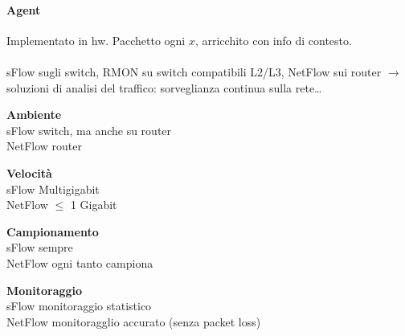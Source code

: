 \documentclass[10pt]{book}
\begin{document}
\paragraph{Agent} Implementato in hw. Pacchetto ogni $x$, arricchito con info di contesto.\\\\
sFlow sugli switch, RMON su switch compatibili L2/L3, NetFlow sui router $\rightarrow$ soluzioni di analisi del traffico: sorveglianza continua sulla rete\ldots
\begin{list}{}{}
	\item \textbf{Ambiente}\\sFlow switch, ma anche su router\\
	NetFlow router
	\item \textbf{Velocità}\\sFlow Multigigabit\\
	NetFlow $\leq$ 1 Gigabit
	\item \textbf{Campionamento}\\sFlow sempre\\
	NetFlow ogni tanto campiona
	\item \textbf{Monitoraggio}\\sFlow monitoraggio statistico\\
	NetFlow monitoragglio accurato (senza packet loss)
\end{list}
\end{document}
